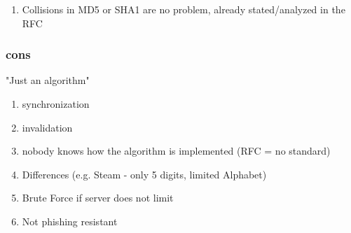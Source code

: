 \begin{enumerate}
	\item Collisions in MD5 or SHA1 are no problem, already stated/analyzed in the RFC
\end{enumerate}

\subsubsection{cons}

"Just an algorithm"

\begin{enumerate}
	\item synchronization
	\item invalidation
	\item nobody knows how the algorithm is implemented (RFC = no standard)
	\item Differences (e.g. Steam - only 5 digits, limited Alphabet)
	\item Brute Force if server does not limit
	\item Not phishing resistant
\end{enumerate}
